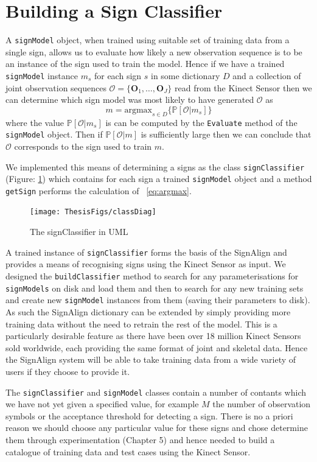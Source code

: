 \section{Building a Sign Classifier}
A \verb|signModel| object, when trained using suitable set of training data from a single sign, allows us to evaluate how likely a new observation sequence is to be an instance of the sign used to train the model. Hence if we have a trained \verb|signModel| instance $m_s$ for each sign $s$ in some dictionary $D$ and a collection of joint observation sequences $\mathcal{O} = \{\mathbf{O}_1, \dots, \mathbf{O}_J\}$ read from the Kinect Sensor then we can determine which sign model was most likely to have generated $\mathcal{O}$ as
\begin{equation*}
m = \text{argmax}_{s \in D}\{ \mathbb{P}[\mathcal{O}|m_s]  \}  \label{eq:argmax} \tag{*}
\end{equation*}
where the value $\mathbb{P}[\mathcal{O}|m_s]$ is can be computed by the \verb|Evaluate| method of the \verb|signModel| object. Then if $\mathbb{P}[\mathcal{O}|m]$ is sufficiently large then we can conclude that $\mathcal{O}$ corresponds to the sign used to train $m$. 

We implemented this means of determining a signs as the class \verb|signClassifier| (Figure: \ref{fig:scuml}) which contains for each sign a trained \verb|signModel| object and a method \verb|getSign| performs the calculation of ~\eqref{eq:argmax}.
\begin{figure}[h!]
        \centering
        \texttt{[image: ThesisFigs/classDiag]}
        \caption{The signClassifier in UML}\label{fig:scuml}
\end{figure}

A trained instance of \verb|signClassifier| forms the basis of the SignAlign and provides a means of recognising signs using the Kinect Sensor as input. We designed the \verb|buildClassifier| method to search for any parameterisations for \verb|signModels| on disk and load them and then to search for any new training sets and create new \verb|signModel| instances from them (saving their parameters to disk). As such the SignAlign dictionary can be extended by simply providing more training data without the need to retrain the rest of the model. This is a particularly desirable feature as there have been over 18 million Kinect Sensors sold worldwide, each providing the same format of joint and skeletal data. Hence the SignAlign system will be able to take training data from a wide variety of users if they choose to provide it.

The \verb|signClassifier| and \verb|signModel| classes contain a number of contants which we have not yet given a specified value, for example $M$ the number of observation symbols or the acceptance threshold for detecting a sign. There is no a priori reason we should choose any particular value for these signs and chose determine them through experimentation (Chapter 5) and hence needed to build a catalogue of training data and test cases using the Kinect Sensor.

